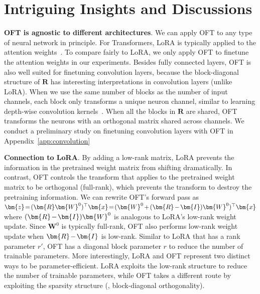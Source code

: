 \vspace{-1.75mm}
\section{Intriguing Insights and Discussions}
\vspace{-1.5mm}

\textbf{OFT is agnostic to different architectures}. We can apply OFT to any type of neural network in principle. For Transformers, LoRA is typically applied to the attention weights~\cite{hulora2022}. To compare fairly to LoRA, we only apply OFT to finetune the attention weights in our experiments. Besides fully connected layers, OFT is also well suited for finetuning convolution layers, because the block-diagonal structure of $\bm{R}$ has interesting interpretations in convolution layers (unlike LoRA). When we use the same number of blocks as the number of input channels, each block only transforms a unique neuron channel, similar to learning depth-wise convolution kernels~\cite{chollet2017xception}. When all the blocks in $\bm{R}$ are shared, OFT transforms the neurons with an orthogonal matrix shared across channels. We conduct a preliminary study on finetuning convolution layers with OFT in Appendix~\ref{app:convolution}

\vspace{-0.4mm}

\textbf{Connection to LoRA}. By adding a low-rank matrix, LoRA prevents the information in the pretrained weight matrix from shifting dramatically. In contrast, OFT controls the transform that applies to the pretrained weight matrix to be orthogonal (full-rank), which prevents the transform to destroy the pretraining information. We can rewrite OFT's forward pass as $\thickmuskip=2mu \medmuskip=2mu \bm{z}=(\bm{R}\bm{W}^0)^\top\bm{x}=(\bm{W}^0+(\bm{R}-\bm{I})\bm{W}^0)^\top\bm{x}$ where $\thickmuskip=2mu \medmuskip=2mu (\bm{R}-\bm{I})\bm{W}^0$ is analogous to LoRA's low-rank weight update. Since $\bm{W}^0$ is typically full-rank, OFT also performs low-rank weight update when $\thickmuskip=2mu \medmuskip=2mu \bm{R}-\bm{I}$ is low-rank. Similar to LoRA that has a rank parameter $r'$, OFT has a diagonal block parameter $r$ to reduce the number of trainable parameters. More interestingly, LoRA and OFT represent two distinct ways to be parameter-efficient. LoRA exploits the low-rank structure to reduce the number of trainable parameters, while OFT takes a different route by exploiting the sparsity structure (\ie, block-diagonal orthogonality).

